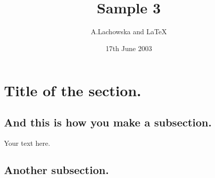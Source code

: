 \documentclass[11pt]{amsart}
\begin{document}
\title{Sample 3}
\author{A.Lachowska and \LaTeX}
\date{17th June 2003}
\maketitle

\section{Title of the section.}

\subsection{And this is how you make a subsection.}


Your text here.

\subsection{Another subsection.}
\end{document}
